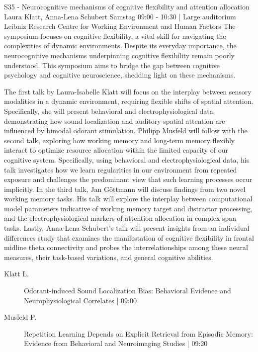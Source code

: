 
            \begin{symposium}
            {S35 - Neurocognitive mechanisms of cognitive flexibility and attention allocation }
            {Laura Klatt, Anna-Lena Schubert}
            {Samstag 09:00 - 10:30 | Large auditorium}
            {Leibniz Research Centre for Working Environment and Human Factors}
            The symposium focuses on cognitive flexibility, a vital skill for navigating the complexities of dynamic environments. Despite its everyday importance, the neurocognitive mechanisms underpinning cognitive flexibility remain poorly understood. This symposium aims to bridge the gap between cognitive psychology and cognitive neuroscience, shedding light on these mechanisms.

The first talk by Laura-Isabelle Klatt will focus on the interplay between sensory modalities in a dynamic environment, requiring flexible shifts of spatial attention. Specifically, she will present behavioral and electrophysiological data demonstrating how sound localization and auditory spatial attention are influenced by bimodal odorant stimulation. Philipp Musfeld will follow with the second talk, exploring how working memory and long-term memory flexibly interact to optimize resource allocation within the limited capacity of our cognitive system. Specifically, using behavioral and electrophysiological data, his talk investigates how we learn regularities in our environment from repeated exposure and challenges the predominant view that such learning processes occur implicitly. In the third talk, Jan Göttmann will discuss findings from two novel working memory tasks. His talk will explore the interplay between computational model parameters indicative of working memory target and distractor processing, and the electrophysiological markers of attention allocation in complex span tasks. Lastly, Anna-Lena Schubert's talk will present insights from an individual differences study that examines the manifestation of cognitive flexibility in frontal midline theta connectivity and probes the interrelationships among these neural measures, their task-based variations, and general cognitive abilities.
            \begin{description}    
            
                \item [ Klatt L.] Odorant-induced Sound Localization Bias: Behavioral Evidence and Neurophysiological Correlates \textcolor{mygray}{ | 09:00}    
                
                \item [ Musfeld P.] Repetition Learning Depends on Explicit Retrieval from Episodic Memory: Evidence from Behavioral and Neuroimaging Studies \textcolor{mygray}{ | 09:20}    
                

\end{description}
\end{symposium}
